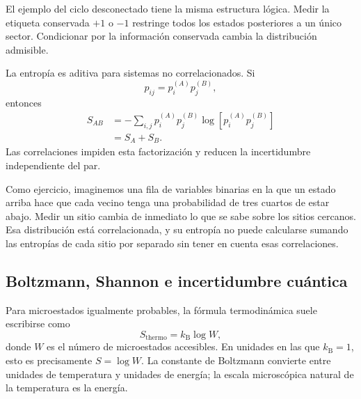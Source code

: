 El ejemplo del ciclo desconectado tiene la misma estructura lógica. Medir la etiqueta conservada \(+1\) o \(-1\) restringe todos los estados posteriores a un único sector. Condicionar por la información conservada cambia la distribución admisible.

La entropía es aditiva para sistemas no correlacionados. Si
\begin{equation}
 p_{ij}=p_i^{(A)}p_j^{(B)},
\end{equation}
entonces
\begin{align}
 S_{AB}
 &=-\sum_{i,j}p_i^{(A)}p_j^{(B)}
 \log\!\left[p_i^{(A)}p_j^{(B)}\right]\\
 &=S_A+S_B.
 \label{eq:sm1-entropy-additivity}
\end{align}
Las correlaciones impiden esta factorización y reducen la incertidumbre independiente del par.

Como ejercicio, imaginemos una fila de variables binarias en la que un estado arriba hace que cada vecino tenga una probabilidad de tres cuartos de estar abajo. Medir un sitio cambia de inmediato lo que se sabe sobre los sitios cercanos. Esa distribución está correlacionada, y su entropía no puede calcularse sumando las entropías de cada sitio por separado sin tener en cuenta esas correlaciones.

\subsection{Boltzmann, Shannon e incertidumbre cuántica}

\begin{classroomqa}
\end{classroomqa}

Para microestados igualmente probables, la fórmula termodinámica suele escribirse como
\begin{equation}
 S_{\mathrm{thermo}}=k_{\mathrm B}\log W,
 \label{eq:sm1-boltzmann-formula}
\end{equation}
donde \(W\) es el número de microestados accesibles. En unidades en las que \(k_{\mathrm B}=1\), esto es precisamente \(S=\log W\). La constante de Boltzmann convierte entre unidades de temperatura y unidades de energía; la escala microscópica natural de la temperatura es la energía.

